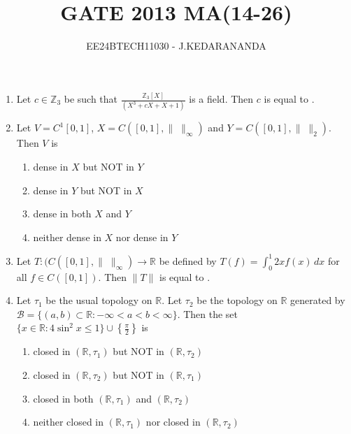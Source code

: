 \documentclass[journal]{IEEEtran}
\renewcommand{\thefigure}{\theenumi}
\renewcommand{\thetable}{\theenumi}
\numberwithin{equation}{enumi}
\numberwithin{figure}{enumi}
\renewcommand{\thetable}{\theenumi}
\begin{document}

\vspace{3cm}

\title{GATE 2013 MA(14-26)}
\author{EE24BTECH11030 - J.KEDARANANDA}
{\let\newpage\relax\maketitle}
\renewcommand{\thefigure}{\theenumi}
\renewcommand{\thetable}{\theenumi}
\begin{enumerate}

\item Let $c \in \mathbb{Z}_3$ be such that $\frac{\mathbb{Z}_3[X]}{(X^3 + cX + X + 1)}$ is a field. Then $c$ is equal to \underline{\hspace{1cm}}.
\bigskip

\item Let $V = C^1[0,1]$, $X = C([0,1], \|\;\|_{\infty})$ and $Y = C([0,1], \|\;\|_2)$. Then $V$ is

\begin{multicols}{2}
    \begin{enumerate}
        \item dense in $X$ but NOT in $Y$
        \item dense in $Y$ but NOT in $X$
        \item dense in both $X$ and $Y$
        \item neither dense in $X$ nor dense in $Y$
    \end{enumerate}
\end{multicols}
\bigskip

\item Let $T : (C([0,1], \|\;\|_{\infty}) \to \mathbb{R}$ be defined by $T(f) = \int_0^1 2xf(x) \, dx$ for all $f \in C([0,1])$. Then $\|T\|$ is equal to \underline{\hspace{1cm}}.
\bigskip

\item Let $\tau_1$ be the usual topology on $\mathbb{R}$. Let $\tau_2$ be the topology on $\mathbb{R}$ generated by $\mathcal{B} = \{(a, b) \subset \mathbb{R} : -\infty < a < b < \infty\}$. Then the set $\{ x \in \mathbb{R} : 4 \sin^2 x \leq 1 \} \cup \left\{ \frac{\pi}{2} \right\}$ is

    \begin{enumerate}
        \item closed in $(\mathbb{R}, \tau_1)$ but NOT in $(\mathbb{R}, \tau_2)$
        \item closed in $(\mathbb{R}, \tau_2)$ but NOT in $(\mathbb{R}, \tau_1)$
        \item closed in both $(\mathbb{R}, \tau_1)$ and $(\mathbb{R}, \tau_2)$
        \item neither closed in $(\mathbb{R}, \tau_1)$ nor closed in $(\mathbb{R}, \tau_2)$
    \end{enumerate}
\bigskip


\end{enumerate}
\end{document}
